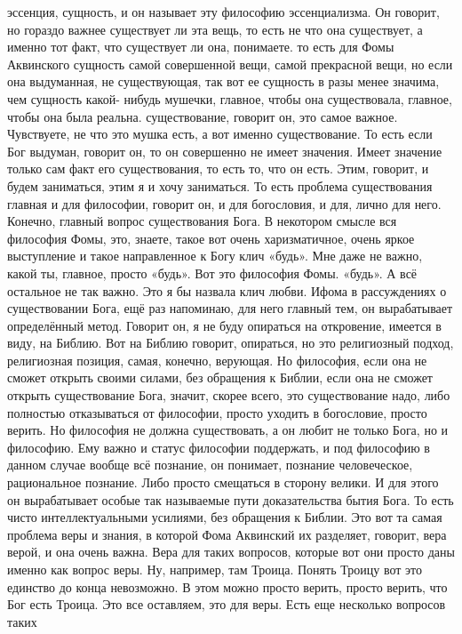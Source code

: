 эссенция, сущность, и он называет эту философию эссенциализма. Он говорит, но
гораздо важнее существует ли эта вещь, то есть не что она существует, а именно
тот факт, что существует ли она, понимаете. то есть для Фомы Аквинского сущность
самой совершенной вещи, самой прекрасной вещи, но если она выдуманная, не
существующая, так вот ее сущность в разы менее значима, чем сущность какой-
нибудь мушечки, главное, чтобы она существовала, главное, чтобы она была
реальна. существование, говорит он, это самое важное. Чувствуете, не что это
мушка есть, а вот именно существование. То есть если Бог выдуман, говорит он, то
он совершенно не имеет значения. Имеет значение только сам факт его
существования, то есть то, что он есть. Этим, говорит, и будем заниматься, этим
я и хочу заниматься. То есть проблема существования главная и для философии,
говорит он, и для богословия, и для, лично для него. Конечно, главный вопрос
существования Бога. В некотором смысле вся философия Фомы, это, знаете, такое
вот очень харизматичное, очень яркое выступление и такое направленное к Богу
клич «будь». Мне даже не важно, какой ты, главное, просто «будь». Вот это
философия Фомы. «будь». А всё остальное не так важно. Это я бы назвала клич
любви. Ифома в рассуждениях о существовании Бога, ещё раз напоминаю, для него
главный тем, он вырабатывает определённый метод. Говорит он, я не буду опираться
на откровение, имеется в виду, на Библию. Вот на Библию говорит, опираться, но
это религиозный подход, религиозная позиция, самая, конечно, верующая. Но
философия, если она не сможет открыть своими силами, без обращения к Библии,
если она не сможет открыть существование Бога, значит, скорее всего, это
существование надо, либо полностью отказываться от философии, просто уходить в
богословие, просто верить. Но философия не должна существовать, а он любит не
только Бога, но и философию. Ему важно и статус философии поддержать, и под
философию в данном случае вообще всё познание, он понимает, познание
человеческое, рациональное познание. Либо просто смещаться в сторону велики. И
для этого он вырабатывает особые так называемые пути доказательства бытия Бога.
То есть чисто интеллектуальными усилиями, без обращения к Библии. Это вот та
самая проблема веры и знания, в которой Фома Аквинский их разделяет, говорит,
вера верой, и она очень важна. Вера для таких вопросов, которые вот они просто
даны именно как вопрос веры. Ну, например, там Троица. Понять Троицу вот это
единство до конца невозможно. В этом можно просто верить, просто верить, что Бог
есть Троица. Это все оставляем, это для веры. Есть еще несколько вопросов таких
